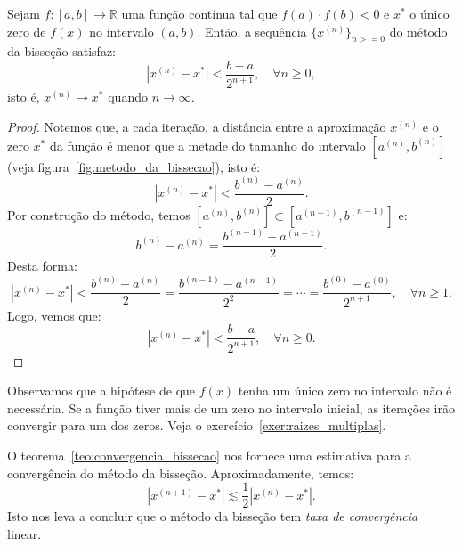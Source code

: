\begin{teo}\label{teo:convergencia_bissecao} Sejam $f:[a, b]\to \mathbb{R}$ uma função contínua tal que $f(a)\cdot f(b) < 0$ e $x^*$ o único zero de $f(x)$ no intervalo $(a, b)$. Então, a sequência $\{x^{(n)}\}_{n>=0}$ do método da bisseção satisfaz:
  \begin{equation*}
    |x^{(n)} - x^{*}| < \frac{b - a}{2^{n+1}},\quad\forall n\geq 0,
  \end{equation*}
isto é, $x^{(n)}\to x^*$ quando $n\to\infty$.
\end{teo}
\begin{proof}
 Notemos que, a cada iteração, a distância entre a aproximação $x^{(n)}$ e o zero $x^*$ da função é menor que a metade do tamanho do intervalo $[a^{(n)}, b^{(n)}]$ (veja figura~\ref{fig:metodo_da_bissecao}), isto é:
\begin{equation*}
  |x^{(n)}-x^*| < \frac{b^{(n)}-a^{(n)}}{2}.
\end{equation*}
Por construção do método, temos $[a^{(n)}, b^{(n)}]\subset [a^{(n-1)}, b^{(n-1)}]$ e:
\begin{equation*}
  b^{(n)} - a^{(n)} = \frac{b^{(n-1)}-a^{(n-1)}}{2}.
\end{equation*}
Desta forma:
\begin{equation*}
  |x^{(n)}-x^*|  < \frac{b^{(n)}-a^{(n)}}{2} = \frac{b^{(n-1)}-a^{(n-1)}}{2^2} = \cdots = \frac{b^{(0)}-a^{(0)}}{2^{n+1}},\quad \forall n\geq 1.
\end{equation*}
Logo, vemos que:
\begin{equation*}
  |x^{(n)}-x^*|  < \frac{b-a}{2^{n+1}},\quad \forall n\geq 0.
\end{equation*} 
\end{proof}

Observamos que a hipótese de que $f(x)$ tenha um único zero no intervalo não é necessária. Se a função tiver mais de um zero no intervalo inicial, as iterações irão convergir para um dos zeros. Veja o exercício~\ref{exer:raizes_multiplas}.

\begin{obs}
  O teorema~\ref{teo:convergencia_bissecao} nos fornece uma estimativa para a convergência do método da bisseção. Aproximadamente, temos:
  \begin{equation*}
    |x^{(n+1)} - x^*| \lesssim \frac{1}{2}|x^{(n)} - x^*|.
  \end{equation*}
Isto nos leva a concluir que o método da bisseção tem \emph{taxa de convergência} linear.
\end{obs}

